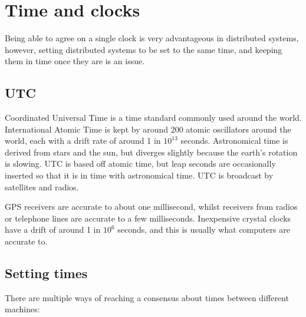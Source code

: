 
\section{Time and clocks}

Being able to agree on a single clock is very advantageous in distributed
systems, however, setting distributed systems to be set to the same time, and
keeping them in time once they are is an issue.

\subsection{UTC}

Coordinated Universal Time is a time standard commonly used around the world.
International Atomic Time is kept by around 200 atomic oscillators around the
world, each with a drift rate of around 1 in $10^13$ seconds. Astronomical time
is derived from stars and the sun, but diverges slightly because the earth's
rotation is slowing. UTC is based off atomic time, but leap seconds are
occasionally inserted so that it is in time with astronomical time. UTC is
broadcast by satellites and radios.

GPS receivers are accurate to about one millisecond, whilst receivers from
radios or telephone lines are accurate to a few milliseconds. Inexpensive
crystal clocks have a drift of around 1 in $10^6$ seconds, and this is usually
what computers are accurate to.

\subsection{Setting times}

There are multiple ways of reaching a consensus about times between different
machines:

